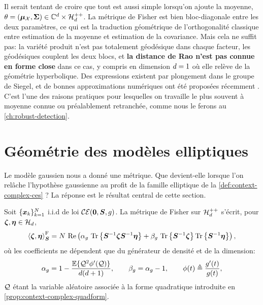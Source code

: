 \begin{remark}
\label{rem:context-geometry-avecmoyenne}
  Il serait tentant de croire que tout est aussi simple lorsqu'on ajoute la moyenne, $\theta=(\boldsymbol{\mu}_{\mathcal{X}},\boldsymbol{\Sigma})\in\mathbb{C}^d\times\mathcal{H}_{d}^{++}$. La métrique de Fisher est bien bloc-diagonale entre les deux paramètres, ce qui est la traduction géométrique de l'orthogonalité classique entre estimation de la moyenne et estimation de la covariance. Mais cela ne suffit pas: la variété produit n'est pas totalement géodésique dans chaque facteur, les géodésiques couplent les deux blocs, et \textbf{la distance de Rao n'est pas connue en forme close} dans ce cas, y compris en dimension $d=1$ où elle relève de la géométrie hyperbolique. Des expressions existent par plongement dans le groupe de Siegel, et de bonnes approximations numériques ont été proposées récemment . C'est l'une des raisons pratiques pour lesquelles on travaille le plus souvent à moyenne connue ou préalablement retranchée, comme nous le ferons au \cref{ch:robust-detection}.
\end{remark}


\section{Géométrie des modèles elliptiques}
\label{sec:context-geometry-elliptical}

Le modèle gaussien nous a donné une métrique. Que devient-elle lorsque l'on relâche l'hypothèse gaussienne au profit de la famille elliptique de la \cref{def:context-complex-ces} ? La réponse est le résultat central de cette section.

\begin{proposition}
\label{prop:context-geometry-fisherces}
  Soit $\{\boldsymbol{x}_k\}_{k=1}^N$ i.i.d de loi $\mathcal{CE}(\boldsymbol{0},\boldsymbol{S},g)$. La métrique de Fisher sur $\mathcal{H}_{d}^{++}$ s'écrit, pour $\boldsymbol{\zeta},\boldsymbol{\eta}\in\mathcal{H}_{d}$,
  \begin{equation}
    \left\langle \boldsymbol{\zeta}, \boldsymbol{\eta} \right\rangle_{\boldsymbol{S}}^{\mathrm{F}}
    =
    N\,\operatorname{\operatorname{Re}}\left(
      \alpha_g\,\operatorname{\operatorname{Tr}}\left\{{\boldsymbol{S}}^{-1}\boldsymbol{\zeta}{\boldsymbol{S}}^{-1}\boldsymbol{\eta}\right\}
      +
      \beta_g\,\operatorname{\operatorname{Tr}}\left\{{\boldsymbol{S}}^{-1}\boldsymbol{\zeta}\right\}\operatorname{\operatorname{Tr}}\left\{{\boldsymbol{S}}^{-1}\boldsymbol{\eta}\right\}
    \right),
    \label{eq:context-geometry-fisherces}
  \end{equation}
  où les coefficients ne dépendent que du générateur de densité et de la dimension:
  \begin{equation}
    \alpha_g
    =
    1 - \frac{\operatorname{\mathbb{E}}\{\mathcal{Q}^2\phi'(\mathcal{Q})\}}{d(d+1)},
    \qquad
    \beta_g = \alpha_g - 1,
    \qquad
    \phi(t) \triangleq \frac{g'(t)}{g(t)},
    \label{eq:context-geometry-alphabeta}
  \end{equation}
  $\mathcal{Q}$ étant la variable aléatoire associée à la forme quadratique introduite en \cref{prop:context-complex-quadform}.
\end{proposition}

